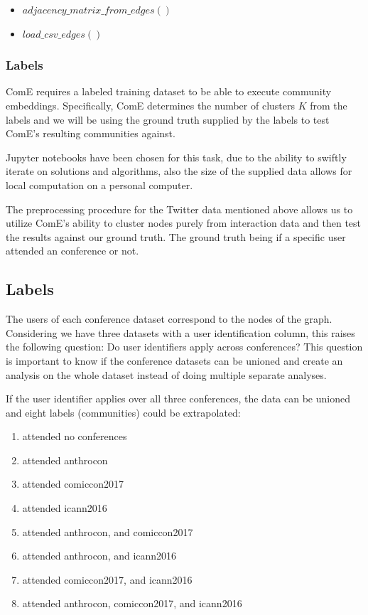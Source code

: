 \documentclass[sigconf]{acmart}
\begin{document}
\begin{itemize}
	\item $adjacency\_matrix\_from\_edges()$
	\item $load\_csv\_edges()$
\end{itemize}

\subsubsection{Labels} ComE requires a labeled training dataset to be able to execute community embeddings. Specifically, ComE determines the number of clusters $K$ from the labels \cite{ComE} and we will be using the ground truth supplied by the labels to test ComE's resulting communities against.

Jupyter notebooks have been chosen for this task, due to the ability to swiftly iterate on solutions and algorithms, also the size of the supplied data allows for local computation on a personal computer.

The preprocessing procedure for the Twitter data mentioned above allows us to utilize ComE's ability to cluster nodes purely from interaction data and then test the results against our ground truth. The ground truth being if a specific user attended an conference or not.

\subsection{Labels}

The users of each conference dataset correspond to the nodes of the graph. Considering we have three datasets with a user identification column, this raises the following question: Do user identifiers apply across conferences? This question is important to know if the conference datasets can be unioned and create an analysis on the whole dataset instead of doing multiple separate analyses.

If the user identifier applies over all three conferences, the data can be unioned and eight labels (communities) could be extrapolated:

\begin{enumerate}
	\item attended no conferences
	\item attended anthrocon
	\item attended comiccon2017
	\item attended icann2016
	\item attended anthrocon, and comiccon2017
	\item attended anthrocon, and icann2016
	\item attended comiccon2017, and icann2016
	\item attended anthrocon, comiccon2017, and icann2016
\end{enumerate}
\end{document}
